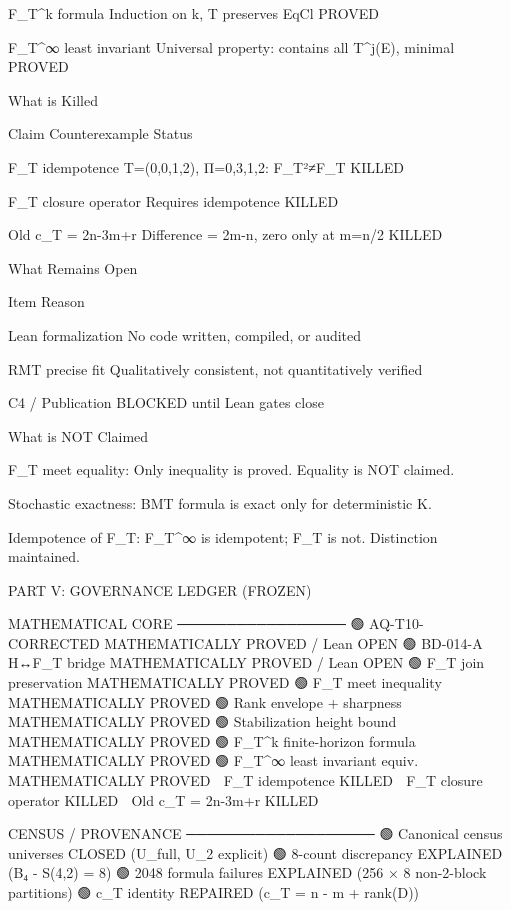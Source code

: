 F_T^k formula	Induction on k, T preserves EqCl	PROVED	

F_T^∞ least invariant	Universal property: contains all T^j(E), minimal	PROVED


What is Killed


Claim	Counterexample	Status	

F_T idempotence	T=(0,0,1,2), Π={{0,3},{1},{2}}: F_T²≠F_T	KILLED	

F_T closure operator	Requires idempotence	KILLED	

Old c_T = 2n-3m+r	Difference = 2m-n, zero only at m=n/2	KILLED


What Remains Open


Item	Reason	

Lean formalization	No code written, compiled, or audited	

RMT precise fit	Qualitatively consistent, not quantitatively verified	

C4 / Publication	BLOCKED until Lean gates close


What is NOT Claimed




F_T meet equality: Only inequality is proved. Equality is NOT claimed.


Stochastic exactness: BMT formula is exact only for deterministic K.


Idempotence of F_T: F_T^∞ is idempotent; F_T is not. Distinction maintained.





PART V: GOVERNANCE LEDGER (FROZEN)


MATHEMATICAL CORE  
─────────────────  
🟢 AQ-T10-CORRECTED              MATHEMATICALLY PROVED / Lean OPEN  
🟢 BD-014-A H↔F_T bridge        MATHEMATICALLY PROVED / Lean OPEN  
🟢 F_T join preservation         MATHEMATICALLY PROVED  
🟢 F_T meet inequality           MATHEMATICALLY PROVED  
🟢 Rank envelope + sharpness     MATHEMATICALLY PROVED  
🟢 Stabilization height bound    MATHEMATICALLY PROVED  
🟢 F_T^k finite-horizon formula  MATHEMATICALLY PROVED  
🟢 F_T^∞ least invariant equiv.  MATHEMATICALLY PROVED  
🔴 F_T idempotence               KILLED  
🔴 F_T closure operator          KILLED  
🔴 Old c_T = 2n-3m+r            KILLED  
  
CENSUS / PROVENANCE  
───────────────────  
🟢 Canonical census universes    CLOSED (U_full, U_2 explicit)  
🟢 8-count discrepancy           EXPLAINED (B₄ - S(4,2) = 8)  
🟢 2048 formula failures         EXPLAINED (256 × 8 non-2-block partitions)  
🟢 c_T identity                  REPAIRED (c_T = n - m + rank(D))  
  
